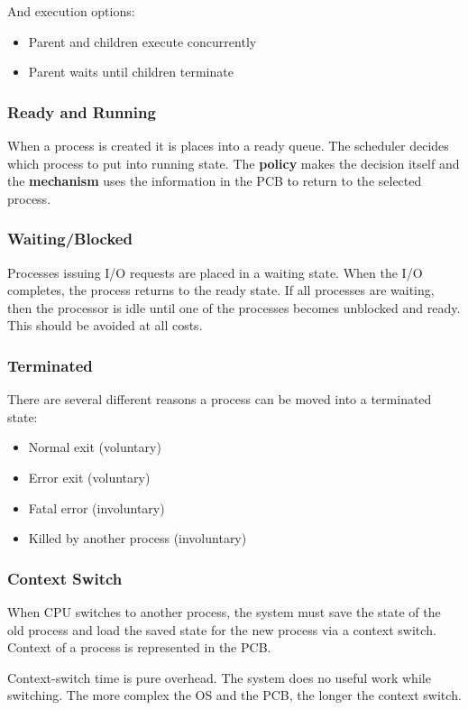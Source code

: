 \documentclass{article}%
\begin{document}
And execution options:
\begin{itemize}
	\item Parent and children execute concurrently
	\item Parent waits until children terminate
\end{itemize}

\subsubsection{Ready and Running}
When a process is created it is places into a ready queue.
The scheduler decides which process to put into running state.
The \textbf{policy} makes the decision itself and the \textbf{mechanism} uses the information in the PCB to return to the selected process.

\subsubsection{Waiting/Blocked}
Processes issuing I/O requests are placed in a waiting state.
When the I/O completes, the process returns to the ready state.
If all processes are waiting, then the processor is idle until one of the processes becomes unblocked and ready.
This should be avoided at all costs.

\subsubsection{Terminated}
There are several different reasons a process can be moved into a terminated state:
\begin{itemize}
	\item Normal exit (voluntary)
	\item Error exit (voluntary)
	\item Fatal error (involuntary)
	\item Killed by another process (involuntary)
\end{itemize}

\subsubsection{Context Switch}
When CPU switches to another process, the system must save the state of the old process and load the saved state for the new process via a context switch.
Context of a process is represented in the PCB.

Context-switch time is pure overhead.
The system does no useful work while switching.
The more complex the OS and the PCB, the longer the context switch.
\end{document}
